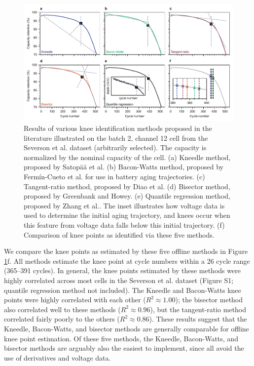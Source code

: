 \documentclass[journal=jpclcd,manuscript=article]{achemso}
\begin{document}
\begin{figure}[h!tb]
\centering
\includegraphics[scale=1]{final_figures/knee_identification_methods.pdf}
\caption{Results of various knee identification methods proposed in the literature illustrated on the batch 2, channel 12 cell from the Severson et al.\cite{severson_data-driven_2019} dataset (arbitrarily selected). The capacity is normalized by the nominal capacity of the cell.
(a) Kneedle method, proposed by Satop{\"a}{\"a} et al.\cite{satopaa_finding_2011}
(b) Bacon-Watts method, proposed by Fermín-Cueto et al. \cite{fermin-cueto_identification_2020} for use in battery aging trajectories.
(c) Tangent-ratio method, proposed by Diao et al.\cite{diao_algorithm_2019}
(d) Bisector method, proposed by Greenbank and Howey.\cite{greenbank_automated_2021}
(e) Quantile regression method, proposed by Zhang et al.\cite{zhang_accelerated_2019}.
The inset illustrates how voltage data is used to determine the initial aging trajectory, and knees occur when this feature from voltage data falls below this initial trajectory.
(f) Comparison of knee points as identified via these five methods.}
\label{fig:knee_identification_methods}
\end{figure}

We compare the knee points as estimated by these five offline methods in Figure \ref{fig:knee_identification_methods}f.
All methods estimate the knee point at cycle numbers within a 26 cycle range (365--391 cycles). 
In general, the knee points estimated by these methods were highly correlated across most cells in the Severson et al.\cite{severson_data-driven_2019} dataset (Figure S1; quantile regression method not included).
The Kneedle and Bacon-Watts knee points were highly correlated with each other ($R^2\approx 1.00$); the bisector method also correlated well to these methods ($R^2\approx 0.96$), but the tangent-ratio method correlated fairly poorly to the others ($R^2\approx 0.86$).
These results suggest that the Kneedle, Bacon-Watts, and bisector methods are generally comparable for offline knee point estimation.
Of these five methods, the Kneedle, Bacon-Watts, and bisector methods are arguably also the easiest to implement, since all avoid the use of derivatives and voltage data.
\end{document}

